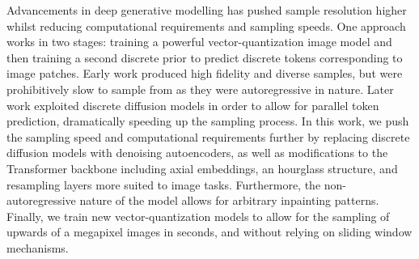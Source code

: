 Advancements in deep generative modelling has pushed sample resolution higher
whilst reducing computational requirements and sampling speeds. One approach
works in two stages: training a powerful vector-quantization image model and
then training a second discrete prior to predict discrete tokens corresponding
to image patches. Early work produced high fidelity and diverse samples, but
were prohibitively slow to sample from as they were autoregressive in nature.
Later work exploited discrete diffusion models in order to allow for parallel
token prediction, dramatically speeding up the sampling process. In this work,
we push the sampling speed and computational requirements further by replacing
discrete diffusion models with denoising autoencoders, as well as modifications
to the Transformer backbone including axial embeddings, an hourglass structure,
and resampling layers more suited to image tasks. Furthermore, the
non-autoregressive nature of the model allows for arbitrary inpainting patterns.
Finally, we train new vector-quantization models to allow for the sampling of
upwards of a megapixel images in seconds, and without relying on sliding window
mechanisms.
